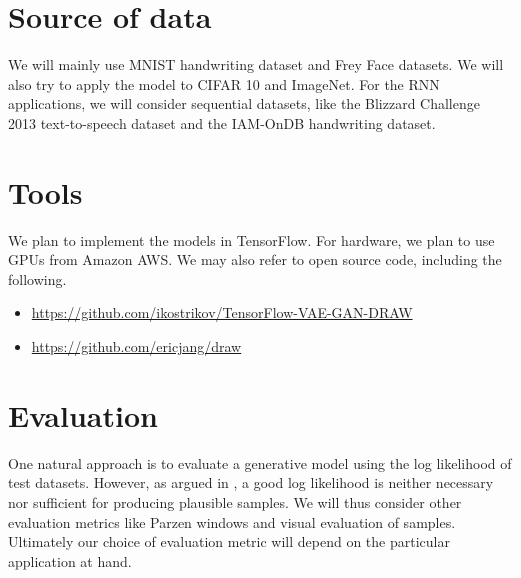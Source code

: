 \documentclass[11pt]{article}
\begin{document}
\section*{Source of data}
We will mainly use MNIST handwriting dataset and Frey Face datasets. We will also try to apply the model to CIFAR 10 and ImageNet.
For the RNN applications, we will consider sequential datasets, like the Blizzard Challenge 2013 text-to-speech dataset and the IAM-OnDB handwriting dataset.

\section*{Tools}
We plan to implement the models in {TensorFlow}.
For hardware, we plan to use GPUs from {Amazon AWS}.
We may also refer to open source code, including the following.
\begin{itemize}
\item \url{https://github.com/ikostrikov/TensorFlow-VAE-GAN-DRAW}
\item \url{https://github.com/ericjang/draw}
\end{itemize}

\section*{Evaluation}

One natural approach is to evaluate a generative model using the log likelihood of test datasets.
However, as argued in \cite{theis2015note}, a good log likelihood is neither necessary nor sufficient for producing plausible samples. We will thus consider other evaluation metrics like Parzen windows and visual evaluation of samples. Ultimately our choice of evaluation metric will depend on the particular application at hand.




\nocite{*}
\end{document}
